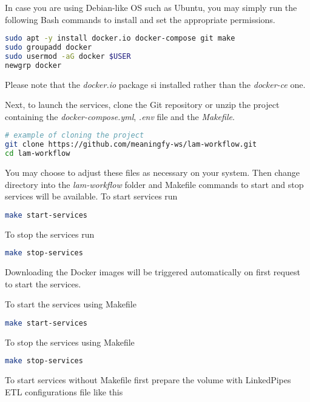 In case you are using Debian-like OS such as Ubuntu, you may simply run the following Bash commands to install and set the appropriate permissions.

\begin{lstlisting}[language=bash,]
sudo apt -y install docker.io docker-compose git make
sudo groupadd docker
sudo usermod -aG docker $USER
newgrp docker
\end{lstlisting}

Please note that the \textit{docker.io} package si installed rather than the \textit{docker-ce} one.

Next, to launch the services, clone the Git repository or unzip the project containing the \textit{docker-compose.yml}, \textit{.env} file and the \textit{Makefile}.

\begin{lstlisting}[language=bash,]
# example of cloning the project
git clone https://github.com/meaningfy-ws/lam-workflow.git
cd lam-workflow
\end{lstlisting}

You may choose to adjust these files as necessary on your system. Then change directory into the \textit{lam-workflow} folder and Makefile commands to start and stop services will be available. To start services run

\begin{lstlisting}[language=bash,]
make start-services
\end{lstlisting}

To stop the services run

\begin{lstlisting}[language=bash,]
make stop-services
\end{lstlisting}

Downloading the Docker images will be triggered automatically on first request to start the services.

To start the services using Makefile

\begin{lstlisting}[language=bash,]
make start-services
\end{lstlisting}

To stop the services using Makefile

\begin{lstlisting}[language=bash,]
make stop-services
\end{lstlisting}

To start services without Makefile first prepare the volume with LinkedPipes ETL configurations file like this

